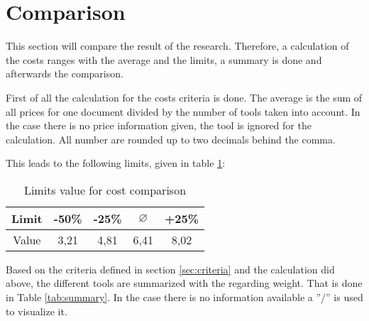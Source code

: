 \section{Comparison} \label{sec:compT}
This section will compare the result of the research. Therefore, a calculation of the costs ranges with the average and the limits, a summary is done and afterwards the comparison.

First of all the calculation for the costs criteria is done. The average is the sum of all prices for one document divided by the number of tools taken into account. In the case there is no price information given, the tool is ignored for the calculation. All number are rounded up to two decimals behind the comma.
\begin{center}
\end{center}

This leads to the following limits, given in table \ref{tab:limitscosts}:
\begin{table}[h!]
	\begin{tabular}{|c|c|c|c|c|} \hline
		Limit & -50\% & -25\% & $ \varnothing$ & +25\% \\ \hline
		Value & 3,21 & 4,81 & 6,41 & 8,02 \\ \hline
	\end{tabular}
	\centering
	\caption{Limits value for cost comparison}
	\label{tab:limitscosts}
\end{table}

Based on the criteria defined in section \ref{sec:criteria} and the calculation did above, the different tools are summarized with the regarding weight. That is done in Table \ref{tab:summary}. In the case there is no information available a ''/'' is used to visualize it.

